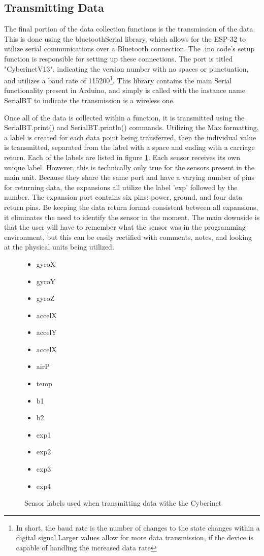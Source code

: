 \subsection{Transmitting Data}
The final portion of the data collection functions is the transmission of the data. This is done using the bluetoothSerial library, which allows for the ESP-32 to utilize serial communications over a Bluetooth connection. The .ino code's setup function is responsible for setting up these connections. The port is titled "CyberinetV13", indicating the version number with no spaces or punctuation, and utilizes a baud rate of 115200\footnote{In short, the baud rate is the number of changes to the state changes within a digital signal.Larger values allow for more data transmission, if the device is capable of handling the increased data rate}. This library contains the main Serial functionality present in Arduino, and simply is called with the instance name SerialBT to indicate the transmission is a wireless one.

Once all of the data is collected within a function, it is transmitted using the SerialBT.print() and SerialBT.println() commands. Utilizing the Max formatting, a label is created for each data point being transferred, then the individual value is transmitted, separated from the label with a space and ending with a carriage return. Each of the labels are listed in figure \ref{fig:sensorLAbels}. Each sensor receives its own unique label. However, this is technically only true for the sensors present in the main unit. Because they share the same port and have a varying number of pins for returning data, the expansions all utilize the label 'exp' followed by the number. The expansion port contains six pins: power, ground, and four data return pins. Be keeping the data return format consistent between all expansions, it eliminates the need to identify the sensor in the moment. The main downside is that the user will have to remember what the sensor was in the programming environment, but this can be easily rectified with comments, notes, and looking at the physical units being utilized.

\begin{figure}
    \centering
    \begin{itemize}
    \item gyroX
    \item gyroY
    \item gyroZ
    \item accelX
    \item accelY
    \item accelX
    \item airP
    \item temp
    \item b1
    \item b2
    \item exp1
    \item exp2
    \item exp3
    \item exp4
\end{itemize}
    \caption{Sensor labels used when transmitting data withe the Cyberinet}
    \label{fig:sensorLAbels}
\end{figure}

